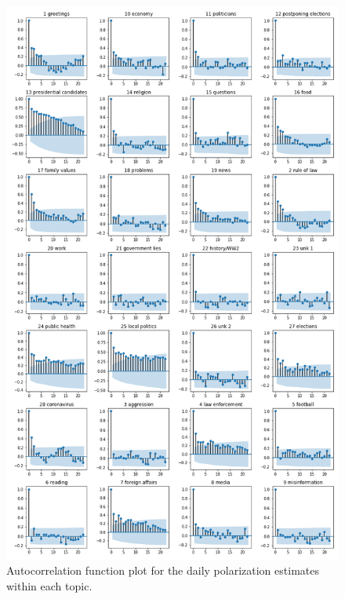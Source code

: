 \documentclass{article}
\begin{document}
	\begin{figure}[!h]
		\centering
		\includegraphics[width=0.8\columnwidth]{figures/topics_autocorrelation.png}
		\caption{Autocorrelation function plot for the daily polarization estimates within each topic.}
		\label{fig:autocorrelation_topics}
	\end{figure}

	\clearpage
\end{document}
